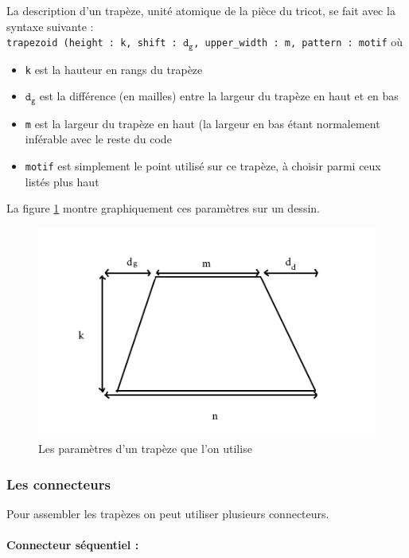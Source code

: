 \documentclass[a4paper,10pt]{article}
\begin{document}
  La description d'un trapèze, unité atomique de la pièce du tricot, se fait avec la syntaxe suivante : \\
\texttt{trapezoid (height : k, shift : $\mathtt{d_g}$, upper\_width : m, pattern : motif} où 
\begin{itemize}
\item \texttt{k} est la hauteur en rangs du trapèze
\item $\mathtt{d_g}$ est la différence (en mailles) entre la largeur du trapèze en haut et en bas
\item \texttt{m} est la largeur du trapèze en haut (la largeur en bas étant normalement inférable avec le reste du code
\item \texttt{motif} est simplement le point utilisé sur ce trapèze, à choisir parmi ceux listés plus haut
\end{itemize}

La figure \ref{trapeze} montre graphiquement ces paramètres sur un dessin.

\begin{figure}[!ht]
  \centering \includegraphics[scale=0.6]{../img/trapeze.jpg}
  \caption{Les paramètres d'un trapèze que l'on utilise}
  \label{trapeze}
\end{figure}

\subsubsection{Les connecteurs}

Pour assembler les trapèzes on peut utiliser plusieurs connecteurs.

\paragraph{Connecteur séquentiel :}
\end{document}

